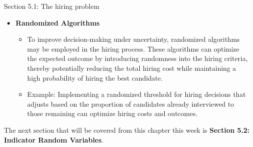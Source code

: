\begin{notes}{Section 5.1: The hiring problem}
\begin{itemize}
        \item \textbf{Randomized Algorithms}
        \begin{itemize}
            \item To improve decision-making under uncertainty, randomized algorithms may be employed in the hiring process. These algorithms can optimize the expected outcome by introducing randomness 
            into the hiring criteria, thereby potentially reducing the total hiring cost while maintaining a high probability of hiring the best candidate.
            \item Example: Implementing a randomized threshold for hiring decisions that adjusts based on the proportion of candidates already interviewed to those remaining can optimize hiring costs 
            and outcomes.
        \end{itemize}
    \end{itemize}
\end{notes}

The next section that will be covered from this chapter this week is \textbf{Section 5.2: Indicator Random Variables}.

